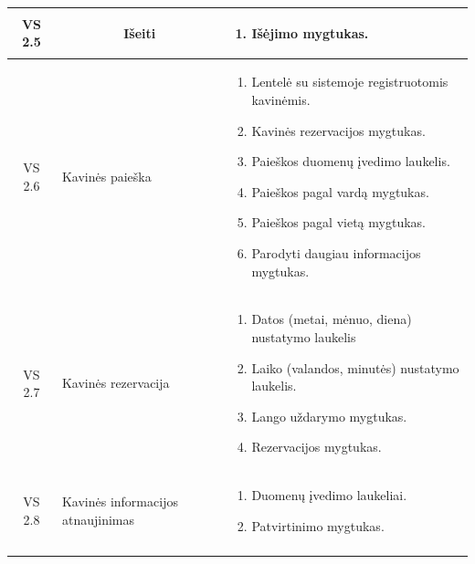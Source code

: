 \documentclass{VUMIFPSkursinis}
\begin{document}
\begin{center}
\begin{longtable}{|p{2cm}|p{}|p{}|}
	\hline 	
		\multicolumn{1}{|c|}{VS 2.5}&
		\multicolumn{1}{|c|}{Išeiti}&
		\multicolumn{1}{|p{8,6cm}|}{
			\begin{enumerate}
				\item Išėjimo mygtukas.
			\end{enumerate}}\\
	
	\hline	
		\multicolumn{1}{|c|}{VS 2.6}&
		{Kavinės paieška}&
		\multicolumn{1}{|p{10,2cm}|}{
			\begin{enumerate}
				\item Lentelė su sistemoje registruotomis kavinėmis.
				\item Kavinės rezervacijos mygtukas.
				\item Paieškos duomenų įvedimo laukelis.
				\item Paieškos pagal vardą mygtukas.
				\item Paieškos pagal vietą mygtukas.
				\item Parodyti daugiau informacijos mygtukas.
			\end{enumerate}}\\
	
	\hline 	
		\multicolumn{1}{|c|}{VS 2.7}&
		{Kavinės rezervacija}&
		\multicolumn{1}{|p{10,2cm}|}{
			\begin{enumerate}
				\item Datos (metai, mėnuo, diena) nustatymo laukelis
				\item Laiko (valandos, minutės) nustatymo laukelis.
				\item Lango uždarymo mygtukas.
				\item Rezervacijos mygtukas.
			\end{enumerate}}\\
	
	\hline
		\multicolumn{1}{|c|}{VS 2.8}& 	
		{Kavinės informacijos atnaujinimas}&
		\multicolumn{1}{|p{8,6cm}|}{
			\begin{enumerate}
				\item Duomenų įvedimo laukeliai.
				\item Patvirtinimo mygtukas.
			\end{enumerate}}\\
	
	\hline
	
	\label{table:3}	
	\end{longtable}

\end{center}

\pagebreak
\end{document}
